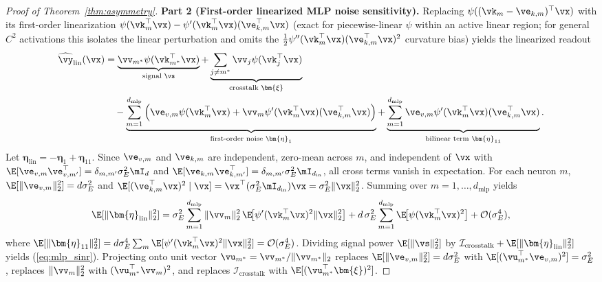 \documentclass[10pt]{article} %
\renewcommand{\eqref}[1]{(\ref{#1})}
\begin{document}
\begin{proof}[Proof of Theorem~\ref{thm:asymmetry}]
\textbf{Part 2 (First-order linearized MLP noise sensitivity).}
Replacing $\psi((\vk_m - \ve_{k,m})^\top \vx)$ with its first-order linearization $\psi(\vk_m^\top \vx) - \psi'(\vk_m^\top \vx)(\ve_{k,m}^\top \vx)$ (exact for piecewise-linear $\psi$ within an active linear region; for general $C^2$ activations this isolates the linear perturbation and omits the $\frac{1}{2}\psi''(\vk_m^\top\vx)(\ve_{k,m}^\top\vx)^2$ curvature bias) yields the linearized readout
\begin{equation}
\begin{aligned}
    \widehat{\vy}_{\text{lin}}(\vx)
    &= \underbrace{\vv_{m^*}\psi(\vk_{m^*}^\top \vx)}_{\text{signal }\vs}
    + \underbrace{\sum_{j \ne m^*} \vv_j \psi(\vk_j^\top \vx)}_{\text{crosstalk }\bm{\xi}} \\
    &\quad - \underbrace{\sum_{m=1}^{d_{\text{mlp}}} \Big(\ve_{v,m}\psi(\vk_m^\top \vx) + \vv_m\psi'(\vk_m^\top \vx)(\ve_{k,m}^\top \vx)\Big)}_{\text{first-order noise }\bm{\eta}_1}
    + \underbrace{\sum_{m=1}^{d_{\text{mlp}}} \ve_{v,m}\psi'(\vk_m^\top \vx)(\ve_{k,m}^\top \vx)}_{\text{bilinear term }\bm{\eta}_{11}}.
\end{aligned}
\end{equation}
Let $\bm{\eta}_{\text{lin}} = -\bm{\eta}_1 + \bm{\eta}_{11}$. Since $\ve_{v,m}$ and $\ve_{k,m}$ are independent, zero-mean across $m$, and independent of $\vx$ with $\E[\ve_{v,m}\ve_{v,m'}^\top] = \delta_{m,m'}\sigma_E^2 \mI_d$ and $\E[\ve_{k,m}\ve_{k,m'}^\top] = \delta_{m,m'}\sigma_E^2 \mI_{d_{\text{in}}}$, all cross terms vanish in expectation. For each neuron $m$, $\E[\|\ve_{v,m}\|_2^2] = d\sigma_E^2$ and $\E[(\ve_{k,m}^\top \vx)^2 \mid \vx] = \vx^\top (\sigma_E^2 \mI_{d_{\text{in}}})\vx = \sigma_E^2 \|\vx\|_2^2$. Summing over $m=1,\dots,d_{\text{mlp}}$ yields
\begin{equation}
    \E[\|\bm{\eta}_{\text{lin}}\|_2^2]
    = \sigma_E^2 \sum_{m=1}^{d_{\text{mlp}}} \|\vv_m\|_2^2\,\E\!\big[\psi'(\vk_m^\top \vx)^2 \|\vx\|_2^2\big]
    + d\,\sigma_E^2 \sum_{m=1}^{d_{\text{mlp}}} \E\!\big[\psi(\vk_m^\top \vx)^2\big]
    + \mathcal{O}(\sigma_E^4),
\end{equation}
where $\E[\|\bm{\eta}_{11}\|_2^2] = d\sigma_E^4 \sum_m \E[\psi'(\vk_m^\top\vx)^2\|\vx\|_2^2] = \mathcal{O}(\sigma_E^4)$. Dividing signal power $\E[\|\vs\|_2^2]$ by $\mathcal{I}_{\text{crosstalk}} + \E[\|\bm{\eta}_{\text{lin}}\|_2^2]$ yields \eqref{eq:mlp_sinr}. Projecting onto unit vector $\vu_{m^*} = \vv_{m^*}/\|\vv_{m^*}\|_2$ replaces $\E[\|\ve_{v,m}\|_2^2] = d\sigma_E^2$ with $\E[(\vu_{m^*}^\top \ve_{v,m})^2] = \sigma_E^2$, replaces $\|\vv_m\|_2^2$ with $(\vu_{m^*}^\top \vv_m)^2$, and replaces $\mathcal{I}_{\text{crosstalk}}$ with $\E[(\vu_{m^*}^\top \bm{\xi})^2]$.
\end{proof}
\end{document}
